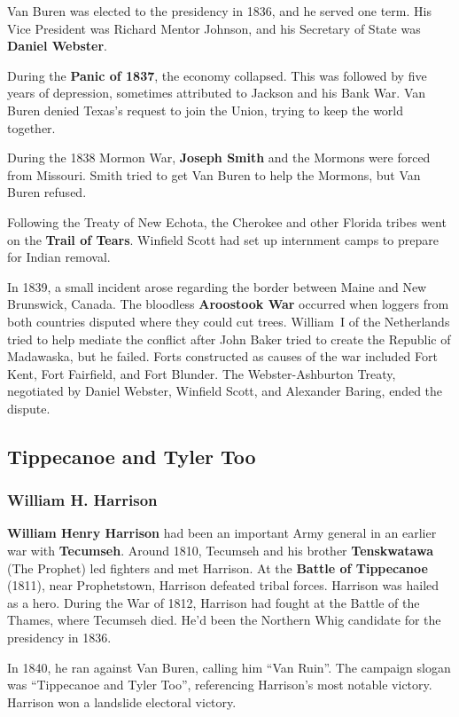 Van Buren was elected to the presidency in 1836, and he served one term.
His Vice President was Richard Mentor Johnson,
and his Secretary of State was \textbf{Daniel Webster}.

During the \textbf{Panic of 1837}, the economy collapsed.
This was followed by five years of depression, sometimes attributed to Jackson and his Bank War.
Van Buren denied Texas's request to join the Union, trying to keep the world together.

During the 1838 Mormon War, \textbf{Joseph Smith} and the Mormons were forced from Missouri.
Smith tried to get Van Buren to help the Mormons, but Van Buren refused.

Following the Treaty of New Echota,
the Cherokee and other Florida tribes went on the \textbf{Trail of Tears}.
Winfield Scott had set up internment camps to prepare for Indian removal.

In 1839, a small incident arose regarding the border between Maine and New Bruns\-wick, Can\-ada.
The bloodless \textbf{Aroostook War}
occurred when loggers from both countries disputed where they could cut trees.
William~I of the Netherlands tried to help mediate the conflict
after John Baker tried to create the Republic of Madawaska, but he failed.
Forts constructed as causes of the war included Fort Kent, Fort Fairfield, and Fort Blunder.
The Webster-Ashburton Treaty,
negotiated by Daniel Webster, Winfield Scott, and Alexander Baring,
ended the dispute.

\subsection*{Tippecanoe and Tyler Too}

\subsubsection*{William H. Harrison}

\textbf{William Henry Harrison} had been an important Army general
in an earlier war with \textbf{Tecumseh}.
Around 1810,
Tecumseh and his brother \textbf{Tenskwatawa} (The Prophet) led fighters and met Harrison.
At the \textbf{Battle of Tippecanoe} (1811), near Prophetstown, Harrison defeated tribal forces.
Harrison was hailed as a hero.
During the War of 1812, Harrison had fought at the Battle of the Thames, where Tecumseh died.
He'd been the Northern Whig candidate for the presidency in 1836.

In 1840, he ran against Van Buren, calling him ``Van Ruin''.
The campaign slogan was ``Tippecanoe and Tyler Too'', referencing Harrison's most notable victory.
Harrison won a landslide electoral victory.

